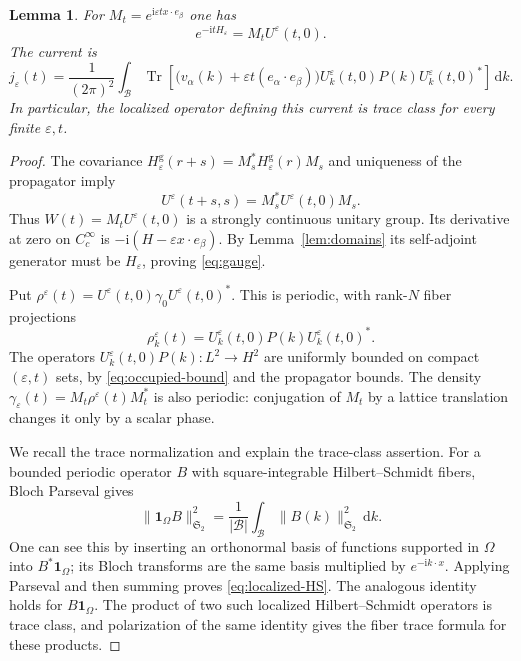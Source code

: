 \documentclass[11pt,a4paper]{article}
\numberwithin{equation}{section}
\newcommand{\one}{\mathbf 1}
\newcommand{\cB}{\mathcal B}
\newcommand{\dd}{\,\mathrm d}
\newcommand{\ii}{\mathrm i}
\DeclareMathOperator{\Tr}{Tr}
\newtheorem{lemma}[theorem]{Lemma}
\theoremstyle{remark}
\begin{document}
\begin{lemma}\label{lem:gauge}
For $M_t=e^{\ii\varepsilon t x\cdot e_\beta}$ one has
\begin{equation}\label{eq:gauge}
 e^{-\ii tH_\varepsilon}=M_tU^\varepsilon(t,0).
\end{equation}
The current is
\begin{equation}\label{eq:exact-current}
 j_\varepsilon(t)=\frac1{(2\pi)^2}\int_{\cB}
  \Tr\!\left[
   \bigl(v_\alpha(k)+\varepsilon t(e_\alpha\cdot e_\beta)\bigr)
   U_k^\varepsilon(t,0)P(k)U_k^\varepsilon(t,0)^*
       \right]\dd k.
\end{equation}
In particular, the localized operator defining this current is trace
class for every finite $\varepsilon,t$.
\end{lemma}

\begin{proof}
The covariance
$H^{\mathrm g}_\varepsilon(r+s)
       =M_s^*H^{\mathrm g}_\varepsilon(r)M_s$
and uniqueness of the propagator imply
\[
 U^\varepsilon(t+s,s)=M_s^*U^\varepsilon(t,0)M_s.
\]
Thus $W(t)=M_tU^\varepsilon(t,0)$ is a strongly continuous unitary
group. Its derivative at zero on $C_c^\infty$ is
$-\ii(H-\varepsilon x\cdot e_\beta)$.
By Lemma~\ref{lem:domains} its self-adjoint generator must be
$H_\varepsilon$, proving \eqref{eq:gauge}.

Put $\rho^\varepsilon(t)=U^\varepsilon(t,0)\gamma_0
U^\varepsilon(t,0)^*$. This is periodic, with rank-$N$ fiber projections
\[
 \rho_k^\varepsilon(t)
       =U_k^\varepsilon(t,0)P(k)U_k^\varepsilon(t,0)^*.
\]
The operators $U_k^\varepsilon(t,0)P(k):L^2\to H^2$ are uniformly
bounded on compact $(\varepsilon,t)$ sets, by
\eqref{eq:occupied-bound} and the propagator bounds.
The density $\gamma_\varepsilon(t)=M_t\rho^\varepsilon(t)M_t^*$
is also periodic: conjugation of $M_t$ by a lattice translation changes
it only by a scalar phase.

We recall the trace normalization and explain the trace-class assertion.
For a bounded periodic operator $B$ with square-integrable
Hilbert--Schmidt fibers, Bloch Parseval gives
\begin{equation}\label{eq:localized-HS}
 \|\one_\Omega B\|_{\mathfrak S_2}^2
    =\frac1{|\cB|}\int_{\cB}
       \|B(k)\|_{\mathfrak S_2}^2\dd k.
\end{equation}
One can see this by inserting an orthonormal basis of functions supported
in $\Omega$ into $B^*\one_\Omega$; its Bloch transforms are the same
basis multiplied by $e^{-\ii k\cdot x}$. Applying Parseval and then
summing proves \eqref{eq:localized-HS}.
The analogous identity holds for $B\one_\Omega$.
The product of two such localized Hilbert--Schmidt operators is trace
class, and polarization of the same identity gives the fiber trace
formula for these products.


\end{proof}
\end{document}
